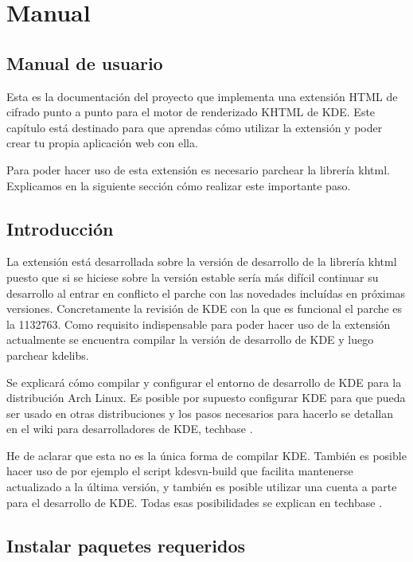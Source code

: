 \chapter{Manual}\label{manual}

\section{Manual de usuario}

Esta es la documentación del proyecto que implementa una extensión HTML de cifrado punto a punto para el motor de renderizado KHTML de KDE. Este capítulo está destinado para que aprendas cómo utilizar la extensión y poder crear tu propia aplicación web con ella.

Para poder hacer uso de esta extensión es necesario parchear la librería khtml. Explicamos en la siguiente sección cómo realizar este importante paso.

\section{Introducción}

La extensión está desarrollada sobre la versión de desarrollo de la librería khtml puesto que si se hiciese sobre la versión estable sería más difícil continuar su desarrollo al entrar en conflicto el parche con las novedades incluídas en próximas versiones. Concretamente la revisión de KDE con la que es funcional el parche es la 1132763. Como requisito indispensable para poder hacer uso de la extensión actualmente se encuentra compilar la versión de desarrollo de KDE y luego parchear kdelibs.

Se explicará cómo compilar y configurar el entorno de desarrollo de KDE para la distribución Arch Linux. Es posible por supuesto configurar KDE para que pueda ser usado en otras distribuciones y los pasos necesarios para hacerlo se detallan en el wiki para desarrolladores de KDE, techbase \cite{build-kde4}.

He de aclarar que esta no es la única forma de compilar KDE. También es posible hacer uso de por ejemplo el script kdesvn-build que facilita mantenerse actualizado a la última versión, y también es posible utilizar una cuenta a parte para el desarrollo de KDE. Todas esas posibilidades se explican en techbase \cite{build-kde4}.

\section{Instalar paquetes requeridos}

